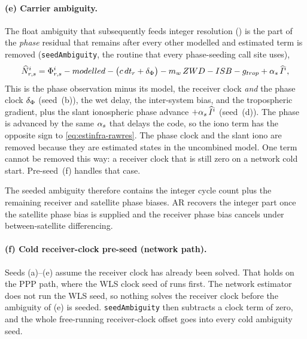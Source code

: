 \documentclass[main.tex]{subfiles}
\begin{document}
\paragraph{(e) Carrier ambiguity.}  The float ambiguity that subsequently feeds
integer resolution () is
the part of the \emph{phase} residual that remains after every other
modelled and estimated term is removed
(\texttt{seedAmbiguity}, the routine that every phase-seeding call site
uses),
\begin{equation}
\widehat{N}^i_{r,s}
= \Phi^i_{r,s} - modelled
  - \bigl(c\,dt_r + \delta_{\Phi}\bigr) - m_w\,ZWD
  - ISB - g_{trop} + \alpha_s\,\widehat{I}^i,
\label{eq:estinfra-amb}
\end{equation}
This is the phase observation minus its model, the receiver clock
\emph{and} the phase clock $\delta_{\Phi}$ (seed~(b)), the wet delay, the
inter-system bias, and the tropospheric gradient, plus the slant
ionospheric phase advance $+\alpha_s\,\widehat{I}^i$ (seed~(d)).  The
phase is advanced by the same $\alpha_s$ that delays the code, so
the iono term has the opposite sign to \eqref{eq:estinfra-rawres}.  The
phase clock and the slant iono are removed because they are estimated
states in the uncombined model.  One term cannot be removed this way: a
receiver clock that is still zero on a network cold start.  Pre-seed~(f)
handles that case.

The seeded ambiguity therefore contains the integer cycle count plus the
remaining receiver and satellite phase biases.  AR recovers the integer
part once the satellite phase bias is supplied and the receiver phase
bias cancels under between-satellite differencing.

\paragraph{(f) Cold receiver-clock pre-seed (network path).}  Seeds (a)--(e)
assume the receiver clock has already been solved.  That holds on the PPP
path, where the WLS clock seed of  runs first.
The network estimator does not run the WLS seed, so nothing solves the
receiver clock before the ambiguity of (e) is seeded.
\texttt{seedAmbiguity} then subtracts a clock term of zero, and
the whole free-running receiver-clock offset goes into every cold
ambiguity seed.
\end{document}
